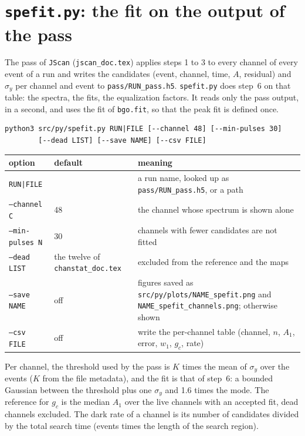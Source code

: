 \documentclass[11pt]{article}
\newcommand{\code}[1]{\texttt{#1}}
\begin{document}
\section{\code{spefit.py}: the fit on the output of the pass}

The pass of \code{JScan} (\code{jscan\_doc.tex}) applies steps 1 to 3 to
every channel of every event of a run and writes the candidates (event,
channel, time, $A$, residual) and $\sigma_y$ per channel and event to
\code{pass/RUN\_pass.h5}. \code{spefit.py} does step~6 on that table: the
spectra, the fits, the equalization factors. It reads only the pass
output, in a second, and uses the fit of \code{bgo.fit}, so that the peak
fit is defined once.

\begin{lstlisting}
python3 src/py/spefit.py RUN|FILE [--channel 48] [--min-pulses 30]
        [--dead LIST] [--save NAME] [--csv FILE]
\end{lstlisting}

\begin{center}
\begin{tabular}{l l p{76mm}}
\toprule
option & default & meaning \\
\midrule
\code{RUN|FILE} & & a run name, looked up as \code{pass/RUN\_pass.h5}, or a path \\
\code{--channel C} & 48 & the channel whose spectrum is shown alone \\
\code{--min-pulses N} & 30 & channels with fewer candidates are not fitted \\
\code{--dead LIST} & the twelve of \code{chanstat\_doc.tex} & excluded from the reference and the maps \\
\code{--save NAME} & off & figures saved as \code{src/py/plots/NAME\_spefit.png} and \code{NAME\_spefit\_channels.png}; otherwise shown \\
\code{--csv FILE} & off & write the per-channel table (channel, $n$, $A_1$, error, $w_1$, $g_c$, rate) \\
\bottomrule
\end{tabular}
\end{center}

Per channel, the threshold used by the pass is $K$ times the mean of
$\sigma_y$ over the events ($K$ from the file metadata), and the fit is
that of step~6: a bounded Gaussian between the threshold plus one
$\sigma_y$ and 1.6 times the mode. The reference for $g_c$ is the median
$A_1$ over the live channels with an accepted fit, dead channels
excluded. The dark rate of a channel is its number of candidates divided
by the total search time (events times the length of the search region).
\end{document}
